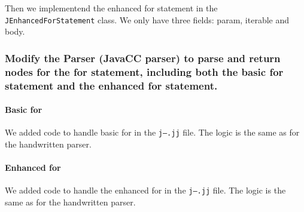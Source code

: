 \documentclass[a4paper, 12pt]{article}
\begin{document}
                Then we implementend the enhanced for statement in the \texttt{JEnhancedForStatement} class. We only have three fields: param, iterable and body.
        
        \subsubsection{Modify the Parser (JavaCC parser) to parse and return nodes for the for statement, including both the basic for statement and the enhanced for statement.}
        
            \paragraph{Basic for}
            
                We added code to handle basic for in the \texttt{j--.jj} file. The logic is the same as for the handwritten parser.
        
            \paragraph{Enhanced for}
            
                 We added code to handle the enhanced for in the \texttt{j--.jj} file. The logic is the same as for the handwritten parser.     
        
\end{document}
